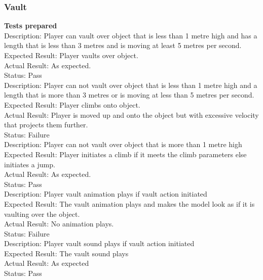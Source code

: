 \documentclass[11pt,a4paper]{article}
\begin{document}
\subsubsection{Vault}
\textbf{Tests prepared}\\
Description: Player can vault over object that is less than 1 metre high and has a length that is less than 3 metres and is moving at least 5 metres per second. \\
Expected Result: Player vaults over object.\\
Actual Result:  As expected.\\
Status: Pass
\smallskip\\
Description: Player can not vault over object that is less than 1 metre high and a length that is more than 3 metres or is moving at less than 5 metres per second. \\
Expected Result: Player climbs onto object.\\
Actual Result:  Player is moved up and onto the object but with excessive velocity that projects them further.\\
Status: Failure
\smallskip\\
Description: Player can not vault over object that is more than 1 metre high\\
Expected Result: Player initiates a climb if it meets the climb parameters else initiates a jump.\\
Actual Result: As expected.\\
Status: Pass
\smallskip\\
Description: Player vault animation plays if vault action initiated\\
Expected Result: The vault animation plays and makes the model look as if it is vaulting over the object.\\
Actual Result:  No animation plays.\\
Status: Failure
\smallskip\\
Description: Player vault sound plays if vault action initiated\\
Expected Result: The vault sound plays\\
Actual Result:  As expected\\
Status: Pass
\end{document}
